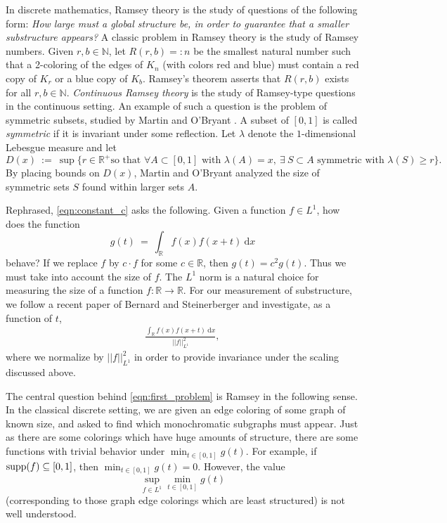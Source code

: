 \documentclass[11pt,reqno]{amsart}
\numberwithin{equation}{section}
\theoremstyle{plain}
\newcommand{\R}{\ensuremath{\mathbb{R}}}
\newcommand{\N}{\mathbb{N}}
\begin{document}
In discrete mathematics, Ramsey theory is the study of questions of the following form: \emph{How large must a global structure be, in order to guarantee that a smaller substructure appears?} A classic problem in Ramsey theory is the study of Ramsey numbers. Given $r,b \in \N$, let $R(r,b)=:n$ be the smallest natural number such that a 2-coloring of the edges of $K_n$ (with colors red and blue) must contain a red copy of $K_r$ or a blue copy of $K_b$. Ramsey's theorem asserts that $R(r,b)$ exists for all $r, b \in \N$. \textit{Continuous Ramsey theory} is the study of Ramsey-type questions in the continuous setting. An example of such a question is the problem of symmetric subsets, studied by Martin and O'Bryant \cite{MO}. A subset of $[0,1]$ is called \textit{symmetric} if it is invariant under some reflection. Let $\lambda$ denote the $1$-dimensional Lebesgue measure and let
\begin{equation}
    D(x)\ := \ \sup\{r \in \R^+ \text{so that }\forall A \subset[0,1]\text{ with } \lambda(A)=x, \ \exists \ S \subset A \text{ symmetric with } \lambda(S)\geq r\}.
\end{equation}
By placing bounds on $D(x)$, Martin and O'Bryant analyzed the size of symmetric sets $S$ found within larger sets $A$.

Rephrased, \eqref{eqn:constant_c} asks the following. Given a function $f \in L^1$, how does the function
\begin{equation}
    g(t) \ =\  \int_\R f(x) f(x+t)\ \mathrm{d}x
\end{equation}
behave? If we replace $f$ by $c\cdot f$ for some $c \in \R$, then $g(t) =c^2 g(t)$. Thus we must take into account the size of $f$. The $L^1$ norm is a natural choice for measuring the size of a function $f: \R \to \R$. For our measurement of substructure, we follow a recent paper of Bernard and Steinerberger \cite{BS} and investigate, as a function of $t$,
\begin{align}\label{eqn:first_problem}
\frac{\displaystyle\int_{\R}f(x)f(x+t)\ \mathrm{d}x}{||f||_{L^1}^{2}},
\end{align}
where we normalize by $||f||_{L^1}^2$ in order to provide invariance under the scaling discussed above.

The central question behind \eqref{eqn:first_problem} is Ramsey in the following sense. In the classical discrete setting, we are given an edge coloring of some graph of known size, and asked to find which monochromatic subgraphs must appear. Just as there are some colorings which have huge amounts of structure, there are some functions with trivial behavior under $\min_{t \in [0,1]} g(t)$. For example, if ${\rm supp}(f) \subseteq [0,1]$, then $\min_{t \in [0,1]} g(t) = 0$. However, the value
\begin{equation}
    \sup\limits_{f\in L^1}\min_{t \in [0,1]} g(t)
\end{equation}
(corresponding to those graph edge colorings which are least structured) is not well understood.
\end{document}
